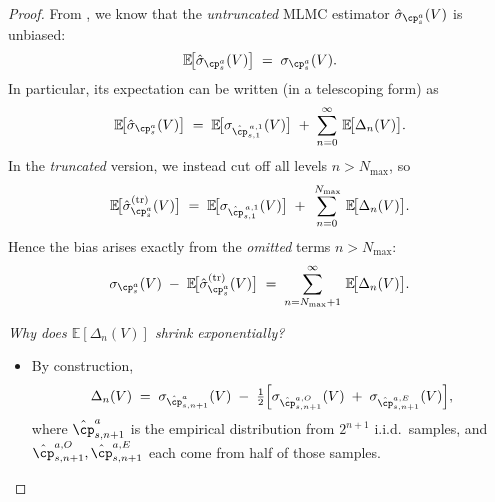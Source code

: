 \begin{proof}
From \citep{wang2023model}, we know that the \emph{untruncated} MLMC estimator $\hat{\sigma}_{\cp^a_s}(V)$ is unbiased:
\begin{equation}
  \mathbb{E}\!\bigl[\hat{\sigma}_{\cp^a_s}(V)\bigr]
  \;=\;
  \sigma_{\cp^a_s}(V).
\end{equation}
In particular, its expectation can be written (in a telescoping form) as 
\begin{equation}
  \mathbb{E}\!\bigl[\hat{\sigma}_{\cp^a_s}(V)\bigr]
  \;=\;
  \mathbb{E}\!\bigl[\sigma_{\hat{\cp}^{\,a,1}_{s,1}}(V)\bigr]
  \;+\;
  \sum_{n=0}^{\infty}\,\mathbb{E}\!\bigl[\Delta_n(V)\bigr].
\end{equation}
In the \emph{truncated} version, we instead cut off all levels $n > N_{\max}$, so
\begin{equation}
  \mathbb{E}\!\bigl[\hat{\sigma}_{\cp^a_s}^{(\mathrm{tr})}(V)\bigr]
  \;=\;
  \mathbb{E}\!\bigl[\sigma_{\hat{\cp}^{\,a,1}_{s,1}}(V)\bigr]
  \;+\;
  \sum_{n=0}^{\,N_{\max}}\,\mathbb{E}\!\bigl[\Delta_n(V)\bigr].
\end{equation}
Hence the bias arises exactly from the \emph{omitted} terms $n>N_{\max}$:
\begin{equation}
  \sigma_{\cp^a_s}(V)
  \;-\;
  \mathbb{E}\!\bigl[\hat{\sigma}_{\cp^a_s}^{(\mathrm{tr})}(V)\bigr]
  \;=\;
  \sum_{n=N_{\max}+1}^{\infty}\,\mathbb{E}\!\bigl[\Delta_n(V)\bigr].
\end{equation}

\noindent
\emph{Why does $\mathbb{E}[\Delta_n(V)]$ shrink exponentially?} 

\smallskip
\begin{itemize}
\item 
By construction,
\begin{equation}
  \Delta_n(V)
  \;=\;
  \sigma_{\hat{\cp}^{a}_{s,n+1}}(V)
  \;-\;\tfrac12\Bigl[
     \sigma_{\hat{\cp}^{a,O}_{s,n+1}}(V)
     \;+\;
     \sigma_{\hat{\cp}^{a,E}_{s,n+1}}(V)
  \Bigr],
\end{equation}
where $\hat{\cp}^{a}_{s,n+1}$ is the empirical distribution from $2^{n+1}$ i.i.d.\ samples, and $\hat{\cp}^{a,O}_{s,n+1},\hat{\cp}^{a,E}_{s,n+1}$ each come from half of those samples.


\end{itemize}
\end{proof}
